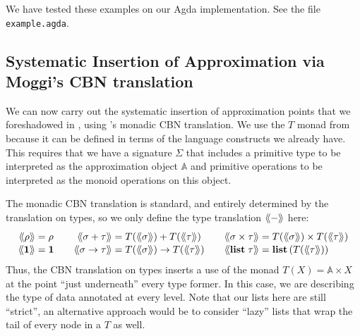 We have tested these examples on our Agda implementation. See the file \texttt{example.agda}.

\subsection{Systematic Insertion of Approximation via Moggi's CBN translation}
\label{sec:cbn-translation}

We can now carry out the systematic insertion of approximation points that we foreshadowed in
, using \citet[\S 3.1]{notions-of-computation}'s monadic CBN
translation. We use the $T$ monad from  because it can be defined in terms of the
language constructs we already have. This requires that we have a signature $\Sigma$ that includes a
primitive type to be interpreted as the approximation object $\mathbb{A}$ and primitive operations to be
interpreted as the monoid operations on this object.

The monadic CBN translation is standard, and entirely determined by the translation on types, so we only
define the type translation $\langle\kern-2pt\langle - \rangle\kern-2pt\rangle$ here:
%
%
%
%
%
\[
\renewcommand{\arraystretch}{1.1}
\begin{array}{r@{\;=\;}l@{\qquad}r@{\;=\;}l@{\qquad}r@{\;=\;}l}
\cbn{\rho} & \rho &
\cbn{\sigma \tySum \tau} & T(\cbn{\sigma}) \tySum T(\cbn{\tau}) &
\cbn{\sigma \tyProd \tau} & T(\cbn{\sigma}) \tyProd T(\cbn{\tau}) \\
\cbn{\tyUnit} & \tyUnit &
\cbn{\sigma \tyFun \tau} & T(\cbn{\sigma}) \tyFun T(\cbn{\tau}) &
\cbn{\tyList\;\tau} & \tyList\,(T(\cbn{\tau}))
\end{array}
\]
Thus, the CBN translation on types inserts a use of the monad $T(X) = \mathbb{A} \times X$ at the point ``just
underneath'' every type former. In this case, we are describing the type of data annotated at every
level. Note that our lists here are still ``strict'', an alternative approach would be to consider ``lazy''
lists that wrap the tail of every node in a $T$ as well.

\newcommand{\Element}{(\TWO \times \TWO)}

